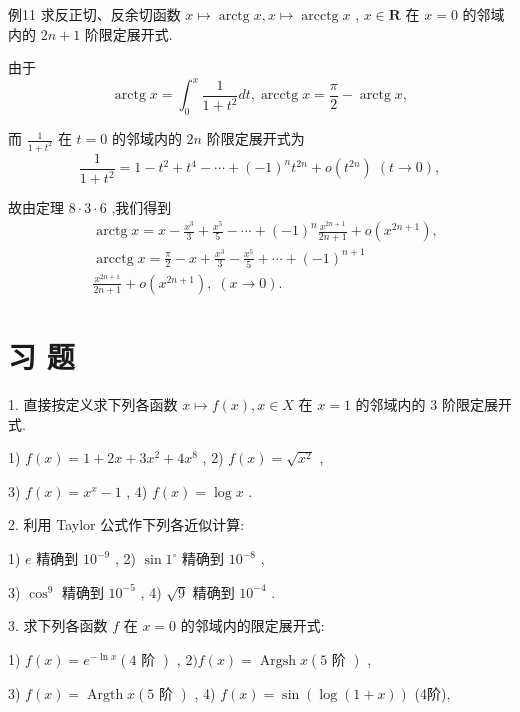 例11 求反正切、反余切函数 $x \mapsto  \operatorname{arctg}x,x \mapsto  \operatorname{arcctg}x$ , $x \in  \mathbf{R}$ 在 $x = 0$ 的邻域内的 ${2n} + 1$ 阶限定展开式.

由于
$$\operatorname{arctg}x = {\int }_{0}^{x}\frac{1}{1 + {t}^{2}}{dt},\operatorname{arcctg}x = \frac{\pi }{2} - \operatorname{arctg}x,$$

而 $\frac{1}{1 + {t}^{2}}$ 在 $t = 0$ 的邻域内的 ${2n}$ 阶限定展开式为
$$\frac{1}{1 + {t}^{2}} = 1 - {t}^{2} + {t}^{4} - \cdots  + {\left( -1\right) }^{n}{t}^{2n} + o\left( {t}^{2n}\right) \;\left( {t \rightarrow  0}\right) ,$$

故由定理 $8 \cdot  3 \cdot  6$ ,我们得到
\begin{align*}
	&\operatorname{arctg}x = x - \frac{{x}^{3}}{3} + \frac{{x}^{5}}{5} - \cdots  + {\left( -1\right) }^{n}\frac{{x}^{{2n} + 1}}{{2n} + 1} + o\left( {x}^{{2n} + 1}\right) ,\\
	&\operatorname{arcctg}x = \frac{\pi }{2} - x + \frac{{x}^{3}}{3} - \frac{{x}^{5}}{5} + \cdots  + {\left( -1\right) }^{n + 1}\\
	&\frac{{x}^{{2n} + 1}}{{2n} + 1} + o\left( {x}^{{2n} + 1}\right) ,\;\left( {x \rightarrow  0}\right) .
\end{align*}

\section*{习 题}

1. 直接按定义求下列各函数 $x \mapsto  f\left( x\right) ,x \in  X$ 在 $x = 1$ 的邻域内的 3 阶限定展开式.

1) $f\left( x\right)  = 1 + {2x} + 3{x}^{2} + 4{x}^{8}$ , 2) $f\left( x\right)  = \sqrt{{x}^{2}}$ ,

3) $f\left( x\right)  = {x}^{x} - 1$ , 4) $f\left( x\right)  = \log x$ .

2. 利用 Taylor 公式作下列各近似计算:

1) $e$ 精确到 ${10}^{-9}$ , 2) $\sin {1}^{ \circ  }$ 精确到 ${10}^{-8}$ ,

3) ${\cos }^{9}$ 精确到 ${10}^{-5}$ , 4) $\sqrt{9}$ 精确到 ${10}^{-4}$ .

3. 求下列各函数 $f$ 在 $x = 0$ 的邻域内的限定展开式:

1) $f\left( x\right)  = {e}^{-\ln x}\left( {4\text{ 阶 }}\right)$ , $2)f\left( x\right)  = \operatorname{Argsh}x\left( {5\text{ 阶 }}\right)$ ,

3) $f\left( x\right)  = \operatorname{Argth}x\left( {5\text{ 阶 }}\right)$ , 4) $f\left( x\right)  = \sin \left( {\log \left( {1 + x}\right) }\right)$ (4阶),


